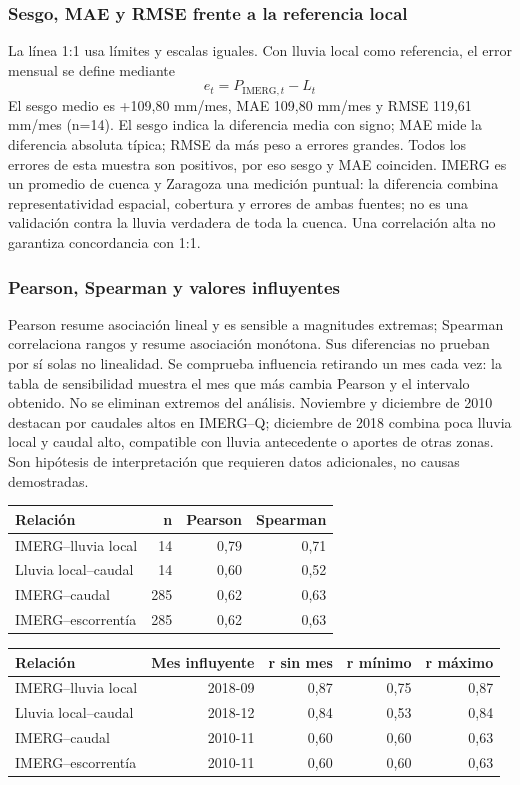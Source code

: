 \documentclass[10pt,a4paper]{article}
\begin{document}
\subsubsection*{Sesgo, MAE y RMSE frente a la referencia local}
La línea 1:1 usa límites y escalas iguales. Con lluvia local como referencia, el error mensual se define mediante
\begin{equation}
e_t=P_{\mathrm{IMERG},t}-L_t
\end{equation}
El sesgo medio es +109,80 mm/mes, MAE 109,80 mm/mes y RMSE 119,61 mm/mes (n=14). El sesgo indica la diferencia media con signo; MAE mide la diferencia absoluta típica; RMSE da más peso a errores grandes. Todos los errores de esta muestra son positivos, por eso sesgo y MAE coinciden. IMERG es un promedio de cuenca y Zaragoza una medición puntual: la diferencia combina representatividad espacial, cobertura y errores de ambas fuentes; no es una validación contra la lluvia verdadera de toda la cuenca. Una correlación alta no garantiza concordancia con 1:1.
\subsubsection*{Pearson, Spearman y valores influyentes}
Pearson resume asociación lineal y es sensible a magnitudes extremas; Spearman correlaciona rangos y resume asociación monótona. Sus diferencias no prueban por sí solas no linealidad. Se comprueba influencia retirando un mes cada vez: la tabla de sensibilidad muestra el mes que más cambia Pearson y el intervalo obtenido. No se eliminan extremos del análisis. Noviembre y diciembre de 2010 destacan por caudales altos en IMERG--Q; diciembre de 2018 combina poca lluvia local y caudal alto, compatible con lluvia antecedente o aportes de otras zonas. Son hipótesis de interpretación que requieren datos adicionales, no causas demostradas.
\begin{center}\small\begin{tabular}{lrrr}\hline
Relación & n & Pearson & Spearman \\ \hline
IMERG--lluvia local & 14 & 0,79 & 0,71 \\
Lluvia local--caudal & 14 & 0,60 & 0,52 \\
IMERG--caudal & 285 & 0,62 & 0,63 \\
IMERG--escorrentía & 285 & 0,62 & 0,63 \\
\hline\end{tabular}\end{center}
\begin{center}\small\begin{tabular}{lrrrr}\hline
Relación & Mes influyente & r sin mes & r mínimo & r máximo \\ \hline
IMERG--lluvia local & 2018-09 & 0,87 & 0,75 & 0,87 \\
Lluvia local--caudal & 2018-12 & 0,84 & 0,53 & 0,84 \\
IMERG--caudal & 2010-11 & 0,60 & 0,60 & 0,63 \\
IMERG--escorrentía & 2010-11 & 0,60 & 0,60 & 0,63 \\
\hline\end{tabular}\end{center}
\end{document}
